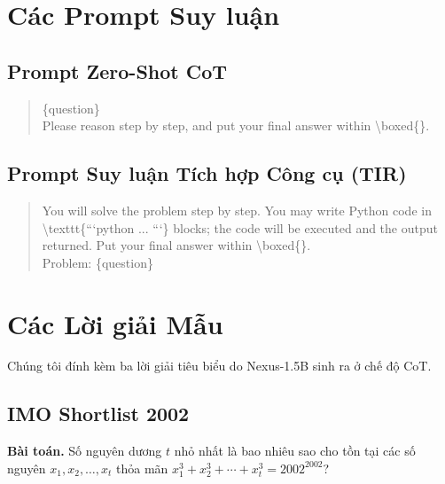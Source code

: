 \documentclass[11pt,a4paper]{article}
\begin{document}
\appendix

\section{Các Prompt Suy luận}

\subsection{Prompt Zero-Shot CoT}

\begin{quote}\ttfamily\small
\{question\}\\
Please reason step by step, and put your final answer within \textbackslash boxed\{\}.
\end{quote}

\subsection{Prompt Suy luận Tích hợp Công cụ (TIR)}

\begin{quote}\ttfamily\small
You will solve the problem step by step. You may write Python code in
\textbackslash texttt\{```python ... ```\} blocks; the code will be executed and the
output returned. Put your final answer within \textbackslash boxed\{\}.\\[4pt]
Problem: \{question\}
\end{quote}

\section{Các Lời giải Mẫu}

Chúng tôi đính kèm ba lời giải tiêu biểu do Nexus-1.5B sinh ra ở chế độ CoT.

\subsection{IMO Shortlist 2002}

\textbf{Bài toán.} Số nguyên dương \(t\) nhỏ nhất là bao nhiêu sao cho tồn tại
các số nguyên \(x_1,x_2,\dots,x_t\) thỏa mãn \(x_1^3+x_2^3+\cdots+x_t^3=2002^{2002}\)?
\end{document}
